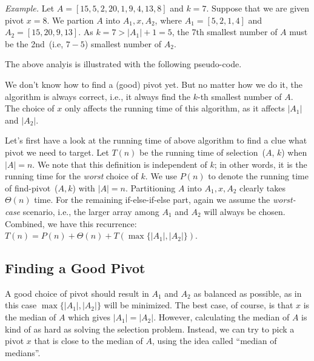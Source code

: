 \emph{Example.} Let $A = [15, 5, 2, 20, 1, 9, 4, 13, 8]$ and $k = 7$.
Suppose that we are given pivot $x = 8$. We partion $A$ into $A_1, x, A_2$,
where $A_1 = [5, 2, 1, 4]$ and $A_2 = [15, 20, 9, 13]$.
As $k = 7 > |A_1| + 1 = 5$, the 7th smallest number of $A$
must be the 2nd~(i.e, $7-5$) smallest number of $A_2$.

The above analyis is illustrated with the following pseudo-code.

\begin{minipage}{0.8\textwidth}
	\xxx
	\aab {\textcolor{blue}{$x$ = find-pivot~($A$)};}\xxx
	\xxx
	\xxx
	\xxx
	\xxx
	\xxx
	\xxx
	\xxx
	\xxx
\end{minipage}

We don't know how to find a (good) pivot yet.
But no matter how we do it, the algorithm is always correct, i.e., it always find the $k$-th smallest number of $A$.
The choice of $x$ only affects the running time of this algorithm, as it affects $|A_1|$ and $|A_2|$.


Let's first have a look at the running time
of above algorithm to find a clue what pivot we need to target.
Let $T(n)$ be the running time of selection~($A$, $k$) when $|A| = n$. We note that this definition is independent of $k$;
in other words, it is the running time for the \emph{worst} choice of $k$.
We use $P(n)$ to denote the running time of find-pivot~($A,k$) with $|A| = n$.
Partitioning $A$ into $A_1,x,A_2$ clearly takes $\Theta(n)$ time.
For the remaining if-else-if-else part, again we assume the \emph{worst-case} scenario, i.e.,
the larger array among $A_1$ and $A_2$ will always be chosen.
Combined, we have this recurrence: $T(n) = P(n) + \Theta(n) + T(\max\{|A_1|, |A_2|\})$.

\subsection*{Finding a Good Pivot}

A good choice of pivot should result in $A_1$ and $A_2$ as balanced as possible, as in this case 
$\max\{|A_1|, |A_2|\}$ will be minimized. %
The best case, of course, is that $x$ is the median of $A$ which gives $|A_1| = |A_2|$. 
However, calculating the median of $A$ is kind of as hard as solving the selection problem.
Instead, we can try to pick a pivot $x$ that is close to the median of $A$, using the idea called ``median of medians''.

